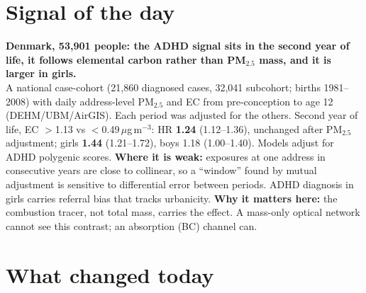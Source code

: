 \documentclass[10pt]{article}
\begin{document}
\vspace{6mm}

\section*{\sffamily\bfseries\color{Deep}Signal of the day}
\vspace{-1.5mm}{\color{Amber}\rule{\linewidth}{1.1pt}}\vspace{2.5mm}

\begin{keybox}
{\sffamily\bfseries\small\color{Deep}Denmark, 53,901 people: the ADHD signal sits in the second year of
life, it follows elemental carbon rather than PM$_{2.5}$ mass, and it is larger in girls.}\\[1.4mm]
\footnotesize
A national case-cohort (21,860 diagnosed cases, 32,041 subcohort; births 1981--2008) with daily address-level PM$_{2.5}$
and EC from pre-conception to age 12 (DEHM/UBM/AirGIS). Each period was adjusted for the others. Second year of life,
EC $>$1.13 vs $<$0.49\,$\mu$g\,m$^{-3}$: HR \textbf{1.24} (1.12--1.36), unchanged after PM$_{2.5}$ adjustment;
girls \textbf{1.44} (1.21--1.72), boys 1.18 (1.00--1.40). Models adjust for ADHD polygenic scores.
\textbf{Where it is weak:} exposures at one address in consecutive years are close to collinear, so a ``window''
found by mutual adjustment is sensitive to differential error between periods. ADHD diagnosis in girls carries
referral bias that tracks urbanicity.
\textbf{Why it matters here:} the combustion tracer, not total mass, carries the effect. A mass-only optical network
cannot see this contrast; an absorption (BC) channel can.\par
\end{keybox}

\vspace{3mm}

\section*{\sffamily\bfseries\color{Deep}What changed today}
\vspace{-1.5mm}{\color{Amber}\rule{\linewidth}{1.1pt}}\vspace{2.5mm}
\end{document}
